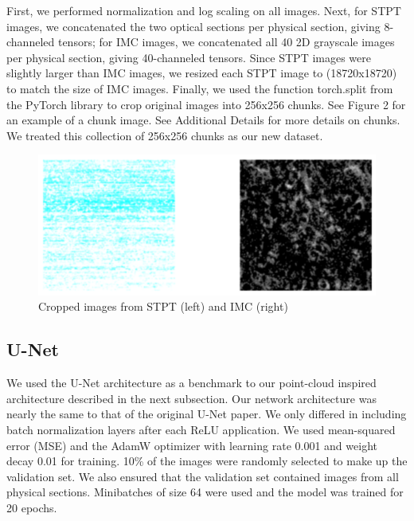 \documentclass[10pt,twocolumn,letterpaper]{article}
\begin{document}
First, we performed normalization and log scaling on all images. Next, for STPT images, we concatenated the two optical sections per physical section, giving 8-channeled tensors; for IMC images, we concatenated all 40 2D grayscale images per physical section, giving 40-channeled tensors. Since STPT images were slightly larger than IMC images, we resized each STPT image to (18720x18720) to match the size of IMC images. Finally, we used the function torch.split from the PyTorch library to crop original images into 256x256 chunks. See Figure 2 for an example of a chunk image. See Additional Details for more details on chunks. We treated this collection of 256x256 chunks as our new dataset. 

\begin{figure}[!h]
	\centering
	\captionsetup{justification=centering}
		\hspace*{-0.2cm}	
		\includegraphics[scale=0.35]{../figures/sample_imc_stpt_crop.png}
	\caption{Cropped images from STPT (left) and IMC (right)}		
\end{figure}


\subsection{U-Net}

We used the U-Net architecture \cite{ronneberger_2015_unet} as a benchmark to our point-cloud inspired architecture described in the next subsection. Our network architecture was nearly the same to that of the original U-Net paper. We only differed in including batch normalization layers after each ReLU application. We used mean-squared error (MSE) and the AdamW \cite{loshchilov_2017_decoupled} optimizer with learning rate 0.001 and weight decay 0.01 for training. 10\% of the images were randomly selected to make up the validation set. We also ensured that the validation set contained images from all physical sections. Minibatches of size 64 were used and the model was trained for 20 epochs.
\end{document}
